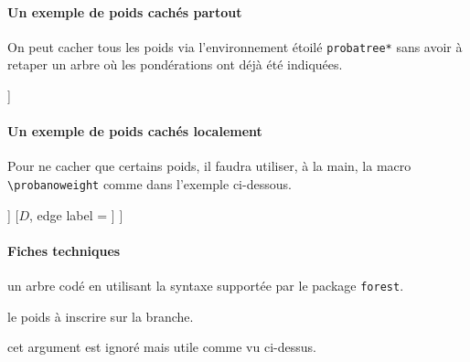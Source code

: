 \documentclass[12pt,a4paper]{article}
\begin{document}
\paragraph{Un exemple de poids cachés partout}

On peut cacher tous les poids via l'environnement étoilé \verb+probatree*+ sans avoir à retaper un arbre où les pondérations ont déjà été indiquées.

\begin{tcblisting}{}
\begin{probatree*}
[$A$, name = left, edge label = \probaweight{$a$}
    [$B$, name = topright, edge label = \probaweight{$b$}]
    [$C$, name = bottomright, edge label = \probaweight{$c$}]
]
\end{probatree*}
\end{tcblisting}


\paragraph{Un exemple de poids cachés localement}

Pour ne cacher que certains poids, il faudra utiliser, à la main, la macro \verb+\probanoweight+ comme dans l'exemple ci-dessous.

\begin{tcblisting}{}
\begin{probatree}
[
    [$A$, name = left, edge label = \probaweight{$a$}
        [$B$, name = topright, edge label = \probanoweight{$b$}]
        [$C$, name = bottomright, edge label = \probaweight{$c$}]
    ]
    [$D$, edge label = ]
]
\end{probatree}
\end{tcblisting}


\paragraph{Fiches techniques}



\Content{} un arbre codé en utilisant la syntaxe supportée par le package \verb+forest+.


\bigskip



\IDarg{} le poids à inscrire sur la branche.


\bigskip



\IDarg{} cet argument est ignoré mais utile comme vu ci-dessus.
\end{document}
